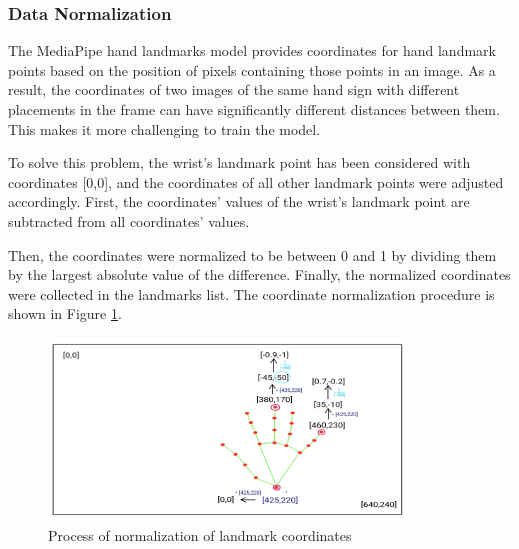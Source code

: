 \subsubsection*{Data Normalization}\label{sec:norm}
The MediaPipe hand landmarks model provides coordinates for hand landmark points based on the position of pixels containing those points in an image. As a result, the coordinates of two images of the same hand sign with different placements in the frame can have significantly different distances between them. This makes it more challenging to train the model.

To solve this problem, the wrist's landmark point has been considered with coordinates [0,0], and the coordinates of all other landmark points were adjusted accordingly.
First, the coordinates' values of the wrist's landmark point are subtracted from all coordinates' values.

Then, the coordinates were normalized to be between 0 and 1 by dividing them by the largest absolute value of the difference. Finally, the normalized coordinates were collected in the landmarks list. The coordinate normalization procedure is shown in Figure \ref{fig:normalization}.


\begin{figure}
	\centering
	\includegraphics[width = 0.85\textwidth]{images/normalise.pdf}
	\caption{Process of normalization of landmark coordinates}
	\label{fig:normalization}
\end{figure}

